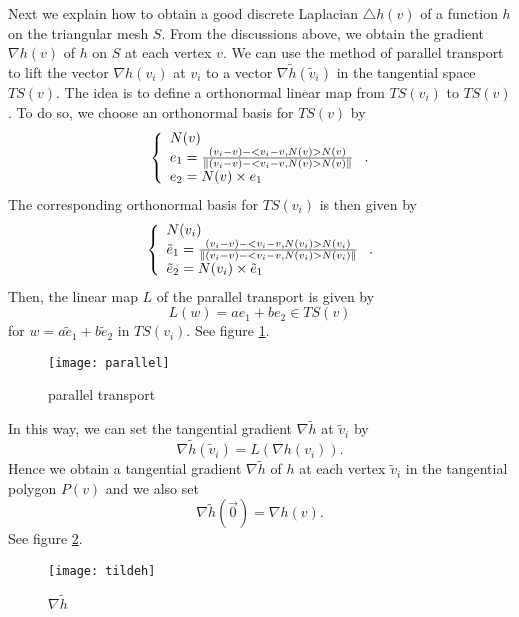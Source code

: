 \documentclass{elsart}
\begin{document}
Next we explain how to obtain a good discrete Laplacian $\triangle
h(v)$ of a function $h$ on the triangular mesh $S$. From the
discussions above, we obtain the gradient $\nabla h(v)$ of $h$ on
$S$ at each vertex $v$. We can use the method of parallel transport
to lift the vector $\nabla h(v_i)$ at $v_i$ to a vector $\nabla
\tilde{ h}(\tilde{v}_i)$ in the tangential space $TS(v)$. The idea
is to define a orthonormal linear map from $TS(v_i)$ to $TS(v)$. To
do so, we choose an orthonormal basis for $TS(v)$ by
\begin{equation} \left \{\begin{array}{l} N(v) \cr e_1 =
\frac{(v_i-v) - <v_i-v,N(v)>N(v)}{\|(v_i-v) - <v_i-v,N(v)>N(v)\|}
\cr e_2 = N(v) \times e_1
\end{array}\right. .\end{equation}
The corresponding orthonormal basis for $TS(v_i)$ is then given by
\begin{equation}
\left \{\begin{array}{l} N(v_i) \cr \tilde{e}_1 = \frac{(v_i-v) -
<v_i-v, N(v_i)>N(v_i)}{ \|(v_i-v) - <v_i-v, N(v_i)>N(v_i) \|} \cr
\tilde{e}_2 = N(v_i) \times \tilde{e}_1
\end{array}\right. .\end{equation}
Then, the linear map $L$ of the parallel transport is given by
\begin{equation} L(w) = a e_1 + b e_2 \in TS(v) \end{equation}
for $w = a\tilde{e}_1 + b\tilde{e}_2 $ in $TS(v_i)$. See figure
\ref{parallel}.


\begin{figure}
{\center
\texttt{[image: parallel]}
\caption{parallel transport}\label{parallel}
 }
\end{figure}



In this way, we can set the tangential gradient $\nabla\tilde{ h}$
at $\tilde{v}_i$ by
\begin{equation} \nabla \tilde{h}(\tilde{v}_i) =
L(\nabla h (v_i) ). \end{equation}
 Hence we obtain a tangential
gradient $\nabla\tilde{ h}$ of $h$ at each vertex $\tilde{v}_i$ in
the tangential polygon $P(v)$ and we also set
\begin{equation}
\nabla \tilde{ h}(\vec{0}) = \nabla h(v). \end{equation}
 See figure \ref{tildeh}.



\begin{figure}
{\center
\texttt{[image: tildeh]}
\caption{$\nabla \tilde{h}$ }\label{tildeh}
 }
\end{figure}
\end{document}
